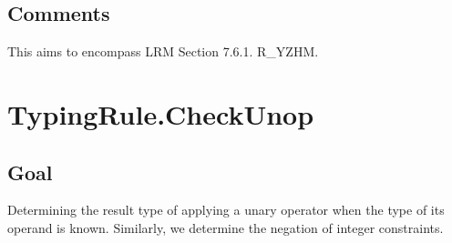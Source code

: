 \documentclass{book}
\begin{document}
\subsection{Comments}
    This aims to encompass LRM Section 7.6.1. R\_YZHM.

\section{TypingRule.CheckUnop \label{sec:TypingRule.CheckUnop}}

\subsection{Goal}
  Determining the result type of applying a unary operator when the type of its operand is known.
  Similarly, we determine the negation of integer constraints.

\begin{comment}
ROMAN: I separated the real case.
\end{comment}

\begin{comment}
ROMAN: it seems to me that we are losing the information of named types. For example, \texttt{type b subtypes boolean = TRUE; boolean c = b;} would not type, but \texttt{type b subtypes boolean = TRUE; boolean c = !b;} would (checkop.asl).
\end{comment}
\end{document}
